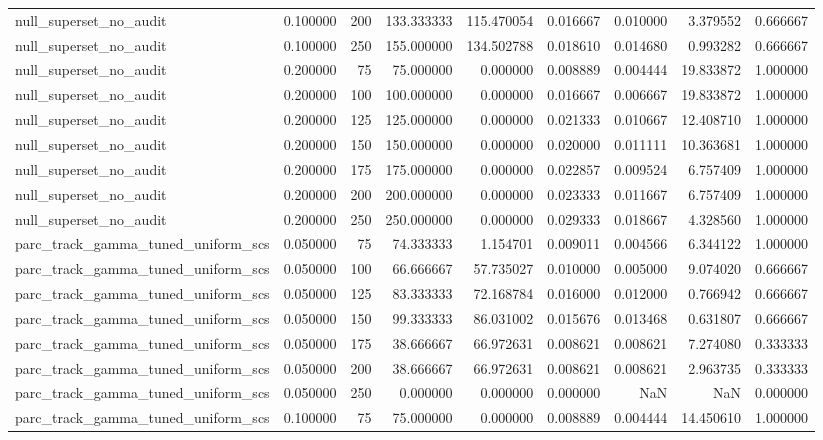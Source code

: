 \begin{tabular}{lrrrrrrrr}
null_superset_no_audit & 0.100000 & 200 & 133.333333 & 115.470054 & 0.016667 & 0.010000 & 3.379552 & 0.666667 \\
null_superset_no_audit & 0.100000 & 250 & 155.000000 & 134.502788 & 0.018610 & 0.014680 & 0.993282 & 0.666667 \\
null_superset_no_audit & 0.200000 & 75 & 75.000000 & 0.000000 & 0.008889 & 0.004444 & 19.833872 & 1.000000 \\
null_superset_no_audit & 0.200000 & 100 & 100.000000 & 0.000000 & 0.016667 & 0.006667 & 19.833872 & 1.000000 \\
null_superset_no_audit & 0.200000 & 125 & 125.000000 & 0.000000 & 0.021333 & 0.010667 & 12.408710 & 1.000000 \\
null_superset_no_audit & 0.200000 & 150 & 150.000000 & 0.000000 & 0.020000 & 0.011111 & 10.363681 & 1.000000 \\
null_superset_no_audit & 0.200000 & 175 & 175.000000 & 0.000000 & 0.022857 & 0.009524 & 6.757409 & 1.000000 \\
null_superset_no_audit & 0.200000 & 200 & 200.000000 & 0.000000 & 0.023333 & 0.011667 & 6.757409 & 1.000000 \\
null_superset_no_audit & 0.200000 & 250 & 250.000000 & 0.000000 & 0.029333 & 0.018667 & 4.328560 & 1.000000 \\
parc_track_gamma_tuned_uniform_scs & 0.050000 & 75 & 74.333333 & 1.154701 & 0.009011 & 0.004566 & 6.344122 & 1.000000 \\
parc_track_gamma_tuned_uniform_scs & 0.050000 & 100 & 66.666667 & 57.735027 & 0.010000 & 0.005000 & 9.074020 & 0.666667 \\
parc_track_gamma_tuned_uniform_scs & 0.050000 & 125 & 83.333333 & 72.168784 & 0.016000 & 0.012000 & 0.766942 & 0.666667 \\
parc_track_gamma_tuned_uniform_scs & 0.050000 & 150 & 99.333333 & 86.031002 & 0.015676 & 0.013468 & 0.631807 & 0.666667 \\
parc_track_gamma_tuned_uniform_scs & 0.050000 & 175 & 38.666667 & 66.972631 & 0.008621 & 0.008621 & 7.274080 & 0.333333 \\
parc_track_gamma_tuned_uniform_scs & 0.050000 & 200 & 38.666667 & 66.972631 & 0.008621 & 0.008621 & 2.963735 & 0.333333 \\
parc_track_gamma_tuned_uniform_scs & 0.050000 & 250 & 0.000000 & 0.000000 & 0.000000 & NaN & NaN & 0.000000 \\
parc_track_gamma_tuned_uniform_scs & 0.100000 & 75 & 75.000000 & 0.000000 & 0.008889 & 0.004444 & 14.450610 & 1.000000 \\

\end{tabular}
